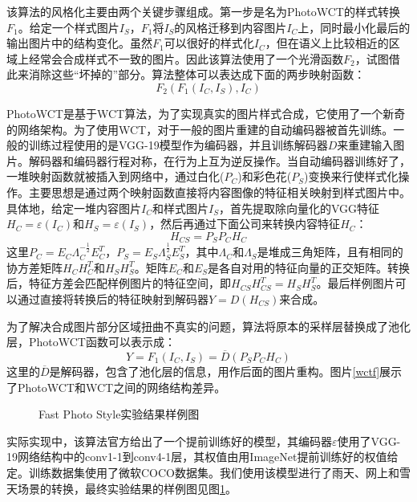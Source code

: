 该算法的风格化主要由两个关键步骤组成。第一步是名为PhotoWCT的样式转换$F_1$。给定一个样式图片$I_S$，$F_1$将$I_S$的风格迁移到内容图片$I_C$上，同时最小化最后的输出图片中的结构变化。虽然$F_1$可以很好的样式化$I_C$，但在语义上比较相近的区域上经常会合成样式不一致的图片。因此该算法使用了一个光滑函数$F_2$，试图借此来消除这些“坏掉的”部分。算法整体可以表达成下面的两步映射函数：
$$F_2(F_1(I_C,I_S),I_C)$$

PhotoWCT是基于WCT\cite{wctp}算法，为了实现真实的图片样式合成，它使用了一个新奇的网络架构。为了使用WCT，对于一般的图片重建的自动编码器被首先训练。一般的训练过程使用的是VGG-19模型作为编码器\varepsilon，并且训练解码器$D$来重建输入图片。解码器和编码器行程对称，在行为上互为逆反操作。当自动编码器训练好了，一堆映射函数就被插入到网络中，通过白化($P_C$)和彩色花($P_S$)变换来行使样式化操作。主要思想是通过两个映射函数直接将内容图像的特征相关映射到样式图片中。具体地，给定一堆内容图片$I_C$和样式图片$I_S$，首先提取除向量化的VGG特征$H_C=\varepsilon(I_C)$和$H_S=\varepsilon(I_S)$，然后再通过下面公司来转换内容特征$H_C$：
$$H_{CS}=P_SP_CH_C$$
这里$P_C=E_C\Lambda_C^{-\frac{1}{2}}E_C^T$，$P_S=E_S\Lambda_S^{\frac{1}{2}}E_S^T$，其中$\Lambda_C$和$\Lambda_S$是堆成三角矩阵，且有相同的协方差矩阵$H_CH_C^T$和$H_SH_S^T$。矩阵$E_C$和$E_S$是各自对用的特征向量的正交矩阵。转换后，特征方差会匹配样例图片的特征空间，即$H_{CS}H_{CS}^T=H_SH_S^T$。最后样例图片可以通过直接将转换后的特征映射到解码器$Y=D(H_{CS})$来合成。

为了解决合成图片部分区域扭曲不真实的问题，算法将原本的采样层替换成了池化层，PhotoWCT函数可以表示成：
$$Y=F_1(I_C,I_S)=\overline{D}(P_SP_CH_C)$$
这里的$\overline{D}$是解码器，包含了池化层的信息，用作后面的图片重构。图片\ref{wctf}展示了PhotoWCT和WCT之间的网络结构差异。

\begin{figure}[t]
    \centering
    \caption{Fast Photo Style实验结果样例图}
    \label{fps-result}
\end{figure}

实际实现中，该算法官方给出了一个提前训练好的模型，其编码器$\varepsilon$使用了VGG-19网络结构中的conv1-1到conv4-1层，其权值由用ImageNet提前训练好的权值给定。训练数据集使用了微软COCO数据集\cite{coco}。我们使用该模型进行了雨天、网上和雪天场景的转换，最终实验结果的样例图见图\ref{fps-result}。

